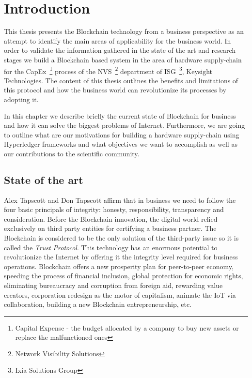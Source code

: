 \chapter{Introduction}
\label{chapter:intro}

This thesis presents the Blockchain technology from a business perspective as an attempt to identify the main areas of applicability for the business world.
In order to validate the information gathered in the state of the art and research stages we build a Blockchain based system in the area of hardware supply-chain for the CapEx~\footnote{Capital Expense - the budget allocated by a company to buy new assets or replace the malfunctioned ones} process of the NVS~\footnote{Network Visibility Solutions} department of ISG~\footnote{Ixia Solutions Group}, Keysight Technologies. The content of this thesis outlines the benefits and limitations of this protocol and how the business world can revolutionize its processes by adopting it.

In this chapter we describe briefly the current state of Blockchain for business and how it can solve the biggest problems of Internet. Furthermore, we are going to outline what are our motivations for building a hardware supply-chain using Hyperledger frameworks and what objectives we want to accomplish as well as our contributions to the scientific community.

\section{State of the art}
\label{sec:intro-section1}
Alex Tapscott and Don Tapscott \cite{tapscott} affirm that in business we need to follow the four basic principals of integrity: honesty, responsibility, transparency and consideration. Before the Blockchain innovation, the digital world relied exclusively on third party entities for certifying a business partner. The Blockchain is considered to be the only solution of the third-party issue so it is called the \emph{Trust Protocol}. This technology has an enormous potential to revolutionize the Internet by offering it the integrity level required for business operations.
Blockchain offers a new prosperity plan for peer-to-peer economy, speeding the process of financial inclusion, global protection for economic rights, eliminating bureaucracy and corruption from foreign aid, rewarding value creators, corporation redesign as the motor of capitalism, animate the IoT via collaboration, building a new Blockchain entrepreneurship, etc.


